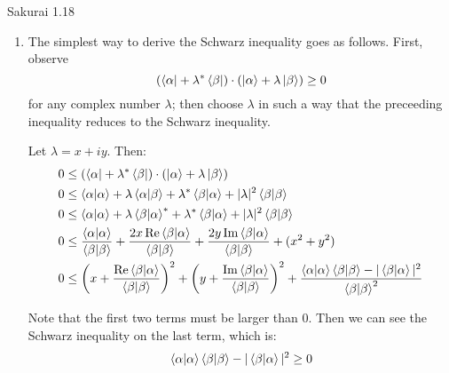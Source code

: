 \documentclass{article}
\begin{document}
\newpage
\begin{section}{Sakurai 1.18}
	\newcommand{\expc}[1]{\left<#1\right>}

	\begin{enumerate}
		\item The simplest way to derive the Schwarz inequality goes as follows. First, observe
			$$
				(\bra{\alpha} + \lambda^*\bra{\beta}) \cdot (\ket{\alpha} + \lambda\ket{\beta}) \geq 0
			$$
			for any complex number $\lambda$; then choose $\lambda$ in such a way that the preceeding inequality reduces to the Schwarz inequality.

			\begin{tcolorbox}
				Let $\lambda = x + iy$. Then:
				\begin{align*}
					0 & \leq (\bra{\alpha} + \lambda^*\bra{\beta}) \cdot (\ket{\alpha} + \lambda\ket{\beta})                                                                                                                                               \\
					0 & \leq \braket{\alpha} + \lambda \braket{\alpha}{\beta} + \lambda^* \braket{\beta}{\alpha} + |\lambda|^2 \braket{\beta}                                                                                                              \\
					0 & \leq \braket{\alpha} + \lambda \braket{\beta}{\alpha}^* + \lambda^* \braket{\beta}{\alpha} + |\lambda|^2 \braket{\beta}                                                                                                            \\
					0 & \leq \frac{\braket{\alpha}}{\braket{\beta}} + \frac{2x \Re \braket{\beta}{\alpha}}{\braket{\beta}} + \frac{2y \Im \braket{\beta}{\alpha}}{\braket{\beta}} + (x^2 + y^2)                                                            \\
					0 & \leq \left(x + \frac{\Re \braket{\beta}{\alpha}}{\braket{\beta}}\right)^2 + \left(y + \frac{\Im \braket{\beta}{\alpha}}{\braket{\beta}}\right)^2 + \frac{\braket{\alpha}\braket{\beta} - |\braket{\beta}{\alpha}|^2}{\braket{\beta}^2} \\
				\end{align*}

				Note that the first two terms must be larger than $0$. Then we can see the Schwarz inequality on the last term, which is:
				\begin{equation*}
					\braket{\alpha}\braket{\beta} - |\braket{\beta}{\alpha}|^2 \geq 0
				\end{equation*}
			\end{tcolorbox}


\end{enumerate}
\end{section}
\end{document}
